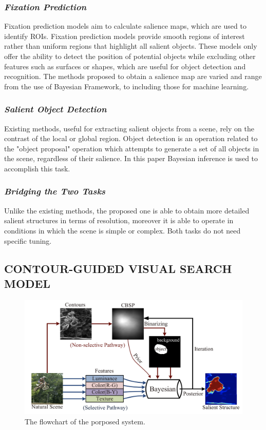 \subsubsection{\emph{Fixation Prediction}}
Fixation prediction models aim to calculate salience maps, which are used to 
identify ROIs. Fixation prediction models provide smooth regions of interest 
rather than uniform regions that highlight all salient objects. These models 
only offer the ability to detect the position of potential objects while excluding 
other features such as surfaces or shapes, which are useful for object 
detection and recognition. The methods proposed to obtain a salience map 
are varied and range from the use of Bayesian Framework, to including those 
for machine learning. 

\subsubsection{\emph{Salient Object Detection}}
Existing methods, useful for extracting salient objects from a scene, rely on 
the contrast of the local or global region. Object detection is an operation 
related to the "object proposal" operation which attempts to generate a set 
of all objects in the scene, regardless of their salience. In this paper Bayesian 
inference is used to accomplish this task.

\subsubsection{\emph{Bridging the Two Tasks}}
Unlike the existing methods, the proposed one is able to obtain more detailed 
salient structures in terms of resolution, moreover it is able to operate in 
conditions in which the scene is simple or complex. Both tasks do not need 
specific tuning.

\subsection{CONTOUR-GUIDED VISUAL SEARCH MODEL}

\begin{figure}[htbp]
    \centering
    \includegraphics[width = 0.8\linewidth]{images/paper1/selective and non-selective pathways.png}
    \centering
    \caption{The flowchart of the porposed system.}
    \label{fid: flowchart}
\end{figure}

